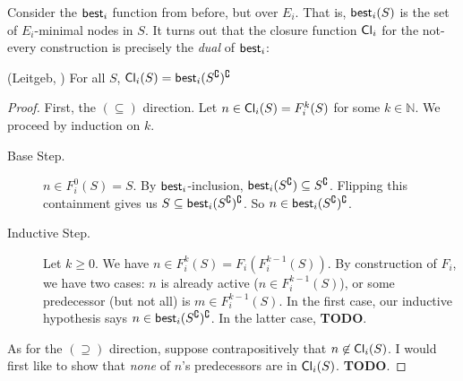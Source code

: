 \documentclass[letterpaper]{article}
\begin{document}
    Consider the $\mathsf{best}_i$ function from before, but over $E_i$.  That is, $\mathsf{best}_i(S)$ is the set of $E_i$-minimal nodes in $S$.  It turns out that the closure function $\mathsf{Cl}_i$ for the not-every construction is precisely the \emph{dual} of $\mathsf{best}_i$:
    \begin{claim*} (Leitgeb, \cite{leitgeb2001nonmonotonic})
        For all $S$, $\mathsf{Cl}_i(S) = \mathsf{best}_i(S^\complement)^\complement$
    \end{claim*}
    \begin{proof}
        First, the $(\subseteq)$ direction.  Let $n \in \mathsf{Cl}_i(S) = F^k_i(S)$ for some $k \in \mathbb{N}$.  We proceed by induction on $k$.
        \begin{description}
            \item[Base Step.] $n \in F^0_i(S) = S$.  By $\mathsf{best}_i$-inclusion, $\mathsf{best}_i(S^\complement) \subseteq S^\complement$. Flipping this containment gives us $S \subseteq \mathsf{best}_i(S^\complement)^\complement$.  So $n \in \mathsf{best}_i(S^\complement)^\complement$.
            
            \item[Inductive Step.] Let $k \geq 0$.  We have $n \in F^k_i(S) = F_i(F^{k-1}_i(S))$.  By construction of $F_i$, we have two cases: $n$ is already active ($n \in F^{k-1}_i(S)$), or some predecessor (but not all) is $m \in F^{k-1}_i(S)$.  In the first case, our inductive hypothesis says $n \in \mathsf{best}_i(S^\complement)^\complement$.  In the latter case, \textbf{TODO}.
        \end{description}

        As for the $(\supseteq)$ direction, suppose contrapositively that $n \not \in \mathsf{Cl}_i(S)$.  I would first like to show that \emph{none} of $n$'s predecessors are in $\mathsf{Cl}_i(S)$. \textbf{TODO}.
    \end{proof}

    
\end{document}
